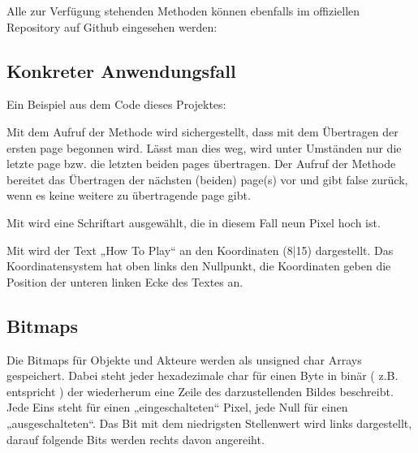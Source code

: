 \documentclass[letterpaper,10pt,ngerman]{sphinxmanual}
\begin{document}
Alle zur Verfügung stehenden Methoden können ebenfalls im offiziellen
Repository auf Github eingesehen werden: 


\subsection{Konkreter Anwendungsfall}
\label{\detokenize{programming:konkreter-anwendungsfall}}
Ein Beispiel aus dem Code dieses Projektes:

\begin{sphinxVerbatim}[commandchars=\\\{\}]
   


    
\end{sphinxVerbatim}

Mit dem Aufruf der Methode  wird sichergestellt, dass mit dem
Übertragen der ersten page begonnen wird. Lässt man dies weg, wird unter
Umständen nur die letzte page bzw. die letzten beiden pages übertragen.
Der Aufruf der Methode  bereitet das Übertragen der nächsten
(beiden) page(s) vor und gibt false zurück, wenn es keine weitere zu
übertragende page gibt.

Mit  wird eine Schriftart ausgewählt, die in diesem Fall neun Pixel
hoch ist.

Mit  wird der Text „How To Play“ an den Koordinaten (8|15)
dargestellt. Das Koordinatensystem hat oben links den Nullpunkt, die
Koordinaten geben die Position der unteren linken Ecke des Textes an.


\subsection{Bitmaps}
\label{\detokenize{programming:bitmaps}}
Die Bitmaps für Objekte und Akteure werden als unsigned char Arrays
gespeichert. Dabei steht jeder hexadezimale char für einen Byte in binär
( z.B. entspricht ) der wiederherum eine Zeile des
darzustellenden Bildes beschreibt. Jede Eins steht für einen „eingeschalteten“
Pixel, jede Null für einen „ausgeschalteten“. Das Bit mit dem niedrigsten
Stellenwert wird links dargestellt, darauf folgende Bits werden rechts davon
angereiht.
\end{document}
